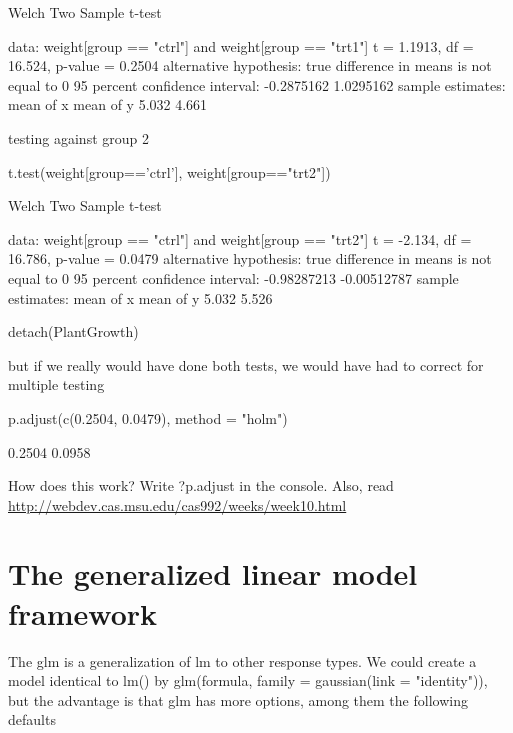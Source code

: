 \documentclass[a4paper,twoside]{tufte-book}\usepackage[]{graphicx}\usepackage[]{color}
\begin{document}
\begin{appendices}
\begin{Schunk}
\begin{Soutput}
	Welch Two Sample t-test

data:  weight[group == "ctrl"] and weight[group == "trt1"]
t = 1.1913, df = 16.524, p-value = 0.2504
alternative hypothesis: true difference in means is not equal to 0
95 percent confidence interval:
 -0.2875162  1.0295162
sample estimates:
mean of x mean of y 
    5.032     4.661 
\end{Soutput}
\end{Schunk}

testing against group 2

\begin{Schunk}
\begin{Sinput}
t.test(weight[group=='ctrl'], weight[group=="trt2"])
\end{Sinput}
\begin{Soutput}

	Welch Two Sample t-test

data:  weight[group == "ctrl"] and weight[group == "trt2"]
t = -2.134, df = 16.786, p-value = 0.0479
alternative hypothesis: true difference in means is not equal to 0
95 percent confidence interval:
 -0.98287213 -0.00512787
sample estimates:
mean of x mean of y 
    5.032     5.526 
\end{Soutput}
\begin{Sinput}
detach(PlantGrowth)
\end{Sinput}
\end{Schunk}

but if we really would have done both tests, we would have had to correct for multiple testing

\begin{Schunk}
\begin{Sinput}
p.adjust(c(0.2504, 0.0479), method = "holm")
\end{Sinput}
\begin{Soutput}
[1] 0.2504 0.0958
\end{Soutput}
\end{Schunk}

How does this work? Write ?p.adjust in the console. Also, read \href{this}{http://webdev.cas.msu.edu/cas992/weeks/week10.html}

\section{The generalized linear model framework}

The glm is a generalization of lm to other response types. We could create a model identical to lm() by glm(formula, family = gaussian(link = "identity")), but the advantage is that glm has more options, among them the following defaults


\end{appendices}
\end{document}
